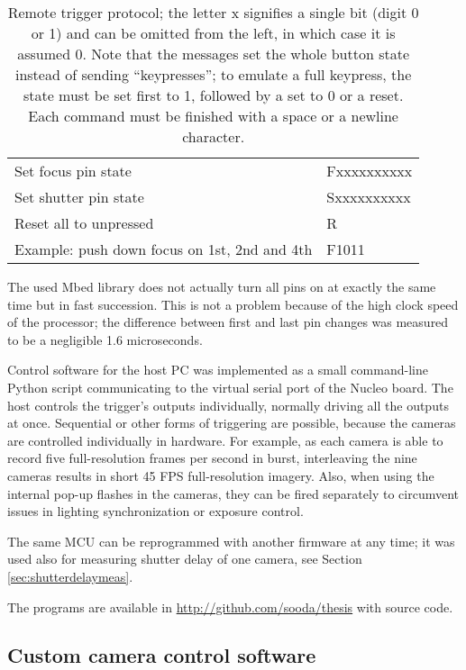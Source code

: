 \begin{table}[h]
	\centering
	\begin{tabular}{l l}
		Set focus pin state & Fxxxxxxxxxx\\
		Set shutter pin state & Sxxxxxxxxxx\\
		Reset all to unpressed & R\\
		Example: push down focus on 1st, 2nd and 4th & F1011\\
	\end{tabular}
	\caption{
		Remote trigger protocol; the letter x signifies a single bit (digit 0 or 1) and can be omitted from the left, in which case it is assumed 0.
		Note that the messages set the whole button state instead of sending ``keypresses'';
		to emulate a full keypress, the state must be set first to 1, followed by a set to 0 or a reset.
		Each command must be finished with a space or a newline character.
	}
	\label{tab:triggerprotocol}
\end{table}

The used Mbed library does not actually turn all pins on at exactly the same time but in fast succession.
This is not a problem because of the high clock speed of the processor;
the difference between first and last pin changes was measured to be a negligible 1.6 microseconds.

Control software for the host PC was implemented as a small command-line Python script communicating to the virtual serial port of the Nucleo board.
The host controls the trigger's outputs individually, normally driving all the outputs at once.
Sequential or other forms of triggering are possible, because the cameras are controlled individually in hardware.
For example, as each camera is able to record five full-resolution frames per second in burst, interleaving the nine cameras results in short 45 FPS full-resolution imagery.
Also, when using the internal pop-up flashes in the cameras, they can be fired separately to circumvent issues in lighting synchronization or exposure control.

The same MCU can be reprogrammed with another firmware at any time; it was used also for measuring shutter delay of one camera, see Section \ref{sec:shutterdelaymeas}.

The programs are available in \url {http://github.com/sooda/thesis} with source code.


\subsection{Custom camera control software} %

